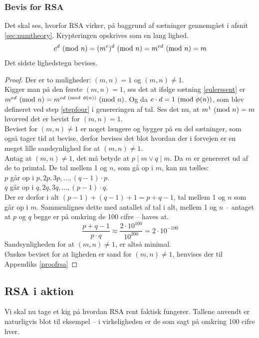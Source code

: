 \subsubsection{Bevis for RSA}
Det skal ses, hvorfor RSA virker, på baggrund af sætninger gennemgået i afsnit \ref{sec:numtheory}.
Krypteringen opskrives som en lang lighed.
\[c^d \ (\mathrm{mod}\ n) = (m^e)^d \ (\mathrm{mod}\ n) = m^{ed} \ (\mathrm{mod}\ n) = m\]
Det sidste lighedstegn bevises.
\begin{proof}
        Der er to muligheder: \((m, n) = 1\) og \((m, n) \neq 1\).\\
        Kigger man på den første \((m, n) = 1\), ses det at ifølge sætning \ref{eulerssent} er \(m^{ed} \ (\mathrm{mod}\ n) = m^{ed \ (\mathrm{mod}\ \phi(n))} \ (\mathrm{mod}\ n)\).
        Og da \(e \cdot d = 1 \ (\mathrm{mod}\ \phi(n))\), som blev defineret ved step \ref{stepfour} i genereringen af tal.
        Ses det nu, at \(m^1 \ (\mathrm{mod}\ n) = m\) hvorved det er bevist for \((m, n) = 1\).\\
        Beviset for \((m, n) \neq 1\) er noget længere og bygger på en del sætninger, som også tager tid at bevise, derfor bevises det blot hvordan der i forvejen er en meget lille sandsynlighed for at \((m, n) \neq 1\).\\
        Antag at \((m, n) \neq 1\), det må betyde at \(p \mid m \lor q \mid m\). Da \(m\) er genereret ud af de to primtal.
        De tal mellem 1 og \(n\), som gå op i \(m\), kan nu tælles:\\
        \(p\) går op i \(p, 2p, 3p, \hdots , (q - 1) \cdot p\).\\
        \(q\) går op i \(q, 2q, 3q, \hdots , (p - 1) \cdot q\).\\
        Der er derfor i alt \((p - 1) + (q - 1) + 1 = p + q - 1\), tal mellem 1 og \(n\) som går op i \(m\).
        Sammenlignes dette med antallet af tal i alt, mellem 1 og \(n\) -- antaget at \(p\) og \(q\) begge er på omkring de 100 cifre -- haves at.
        \[\frac{p + q - 1}{p \cdot q} \approx \frac{2 \cdot 10^{100}}{10^{200}} = 2 \cdot 10^{-100}\]
        Sandsynligheden for at \((m, n) \neq 1\), er altså minimal.\\
        Ønskes beviset for at ligheden er sand for \((m, n) \neq 1\), henvises der til Appendiks \ref{proofrsa}
\end{proof}


\subsection{RSA i aktion}
Vi skal nu tage et kig på hvordan RSA rent faktisk fungerer.
Tallene anvendt er naturligvis blot til eksempel -- i virkeligheden er de som sagt på omkring 100 cifre hver.\\

